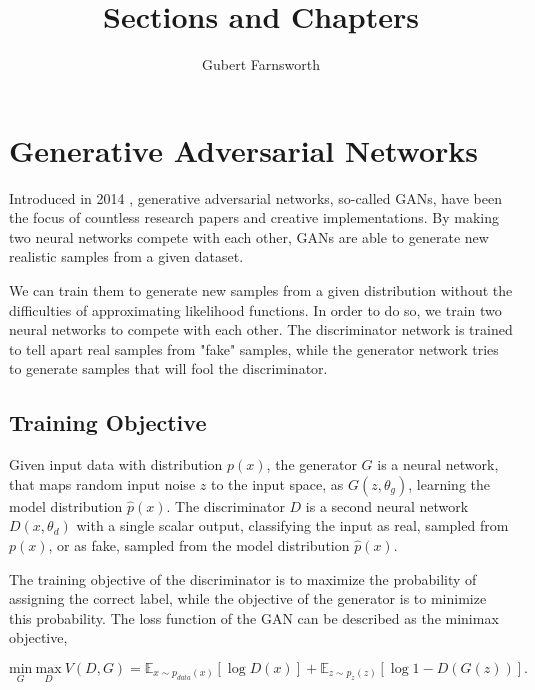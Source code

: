 \documentclass{article}
\title{Sections and Chapters}
\author{Gubert Farnsworth}
\date{ }
\begin{document}
\maketitle
\tableofcontents


\section{Generative Adversarial Networks}


Introduced in 2014 \cite{goodfellow_generative_2014}, generative adversarial  networks, so-called GANs, have been the focus of countless research papers and creative implementations. By making two neural networks compete with each other, GANs are able to generate new realistic samples from a given dataset.



We can train them to generate new samples from a given distribution without the difficulties of approximating likelihood functions. In order to do so, we train two neural networks to compete with each other. The discriminator network is trained to tell apart real samples from "fake" samples, while the generator network tries to generate samples that will fool the discriminator.

\subsection{Training Objective} \label{sec:GAN_training}
Given input data with distribution $p(x)$, the generator $G$ is a neural network, that maps random input noise $z$ to the input space, as $G(z, \theta_{g})$, learning the model distribution $\hat{p}(x)$. The discriminator $D$ is a second neural network $D(x, \theta_{d})$ with a single scalar output, classifying the input as real, sampled from $p(x)$, or as fake, sampled from the model distribution $\hat{p}(x)$. 

The training objective of the discriminator is to maximize the probability of assigning the correct label, while the objective of the generator is to minimize this probability. The loss function of the GAN can be described as the minimax objective,

\begin{equation}
\underset{G}{\mathrm{min}} \ \underset{D}{\mathrm{max}} \ V(D,G) = \mathbb{E}_{x \sim p_{data}(x)}[\log D(x)] + \mathbb{E}_{z \sim p_{z}(z)}[\log 1 - D(G(z))].
\label{eq:minimax}
\end{equation}
\end{document}
